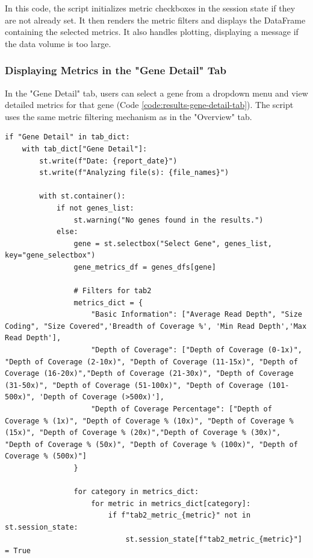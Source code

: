 In this code, the script initializes metric checkboxes in the session state if they are not already set. It then renders the metric filters and displays the DataFrame containing the selected metrics. It also handles plotting, displaying a message if the data volume is too large.

\subsubsection{\textbf{Displaying Metrics in the "Gene Detail" Tab}}

In the "Gene Detail" tab, users can select a gene from a dropdown menu and view detailed metrics for that gene (Code \ref{code:results-gene-detail-tab}). The script uses the same metric filtering mechanism as in the "Overview" tab.

\begin{longlisting}
\begin{verbatim}
if "Gene Detail" in tab_dict:
    with tab_dict["Gene Detail"]:
        st.write(f"Date: {report_date}")
        st.write(f"Analyzing file(s): {file_names}")
        
        with st.container():
            if not genes_list:
                st.warning("No genes found in the results.")
            else:
                gene = st.selectbox("Select Gene", genes_list, key="gene_selectbox")
                gene_metrics_df = genes_dfs[gene]

                # Filters for tab2
                metrics_dict = {
                    "Basic Information": ["Average Read Depth", "Size Coding", "Size Covered",'Breadth of Coverage %', 'Min Read Depth','Max Read Depth'],
                    "Depth of Coverage": ["Depth of Coverage (0-1x)", "Depth of Coverage (2-10x)", "Depth of Coverage (11-15x)", "Depth of Coverage (16-20x)","Depth of Coverage (21-30x)", "Depth of Coverage (31-50x)", "Depth of Coverage (51-100x)", "Depth of Coverage (101-500x)", 'Depth of Coverage (>500x)'],
                    "Depth of Coverage Percentage": ["Depth of Coverage % (1x)", "Depth of Coverage % (10x)", "Depth of Coverage % (15x)", "Depth of Coverage % (20x)","Depth of Coverage % (30x)", "Depth of Coverage % (50x)", "Depth of Coverage % (100x)", "Depth of Coverage % (500x)"]
                }

                for category in metrics_dict:
                    for metric in metrics_dict[category]:
                        if f"tab2_metric_{metric}" not in st.session_state:
                            st.session_state[f"tab2_metric_{metric}"] = True


\end{verbatim}
\end{longlisting}
